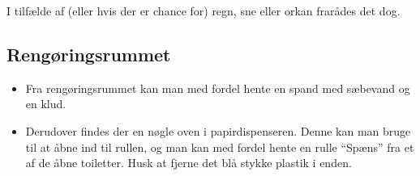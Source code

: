 I tilfælde af (eller hvis der er chance for) regn, sne eller orkan
frarådes det dog.

\subsection{Rengøringsrummet}
\label{sec:pre:rengøring}
\begin{itemize}
	\item Fra rengøringsrummet kan man med fordel hente en spand med sæbevand og en klud.
	\item Derudover findes der en nøgle oven i papirdispenseren. Denne kan man bruge til 
	at åbne ind til rullen, og man kan med fordel hente en rulle ``Spæns'' 
	fra et af de åbne toiletter. Husk at fjerne det blå stykke plastik i enden.
\end{itemize}